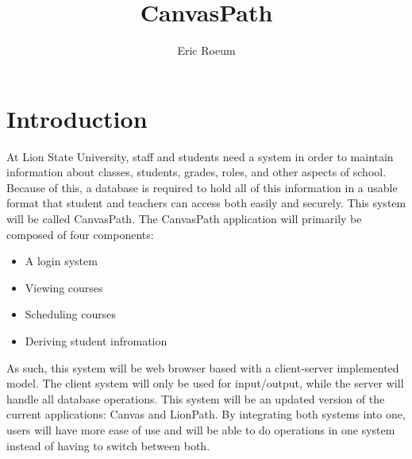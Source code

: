 \documentclass{article}
\title{CanvasPath}
\author{Eric Roeum}
\begin{document}
  \maketitle
  \newpage

  \tableofcontents
  \newpage

  \listoffigures
  \newpage



  \section{Introduction}\label{sec:Introduction}
    At Lion State University, staff and students need a system in order to maintain information about classes, students, grades, roles, and other aspects of school.  Because of this, a database is required to hold all of this information in a usable format that student and teachers can access both easily and securely.  This system will be called CanvasPath.  The CanvasPath application will primarily be composed of four components:
    \begin{itemize}
        \item A login system
        \item Viewing courses
        \item Scheduling courses
        \item Deriving student infromation
    \end{itemize}
    As such, this system will be web browser based with a client-server implemented model.  The client system will only be used for input/output, while the server will handle all database operations.
    \newline\newline
    This system will be an updated version of the current applications: Canvas and LionPath.  By integrating both systems into one, users will have more ease of use and will be able to do operations in one system instead of having to switch between both.

  \medskip
\end{document}
